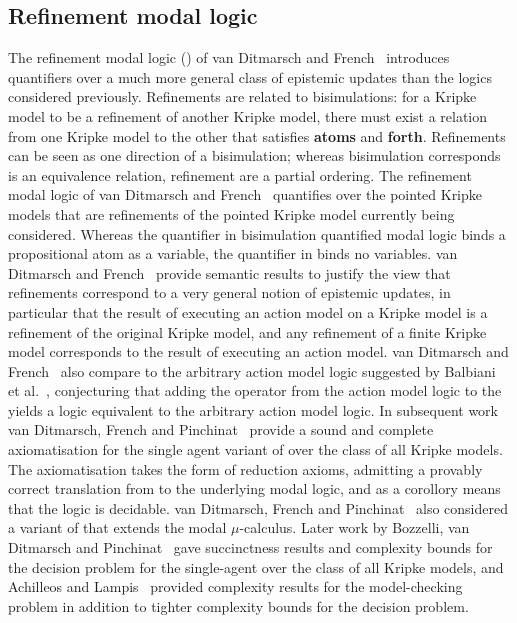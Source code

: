 \subsection{Refinement modal logic}

The refinement modal logic (\logicRml{}) of van Ditmarsch and French~\cite{vanditmarsch:2009} introduces quantifiers over a much more general class of epistemic updates than the logics considered previously.
Refinements are related to bisimulations: for a Kripke model to be a refinement of another Kripke model, there must exist a relation from one Kripke model to the other that satisfies {\bf atoms} and {\bf forth}.
Refinements can be seen as one direction of a bisimulation; whereas bisimulation corresponds is an equivalence relation, refinement are a partial ordering.
The refinement modal logic of van Ditmarsch and French~\cite{vanditmarsch:2009} quantifies over the pointed Kripke models that are refinements of the pointed Kripke model currently being considered.
Whereas the quantifier in bisimulation quantified modal logic binds a propositional atom as a variable, the quantifier in \logicRml{} binds no variables.
van Ditmarsch and French~\cite{vanditmarsch:2009} provide semantic results to justify the view that refinements correspond to a very general notion of epistemic updates, in particular that the result of executing an action model on a Kripke model is a refinement of the original Kripke model, and any refinement of a finite Kripke model corresponds to the result of executing an action model.
van Ditmarsch and French~\cite{vanditmarsch:2009} also compare \logicRml{} to the arbitrary action model logic suggested by Balbiani et al.~\cite{balbiani:2007}, conjecturing that adding the operator from the action model logic to the \logicRml{} yields a logic equivalent to the arbitrary action model logic.
In subsequent work van Ditmarsch, French and Pinchinat~\cite{vanditmarsch:2010} provide a sound and complete axiomatisation for the single agent variant of \logicRml{} over the class of all Kripke models.
The axiomatisation takes the form of reduction axioms, admitting a provably correct translation from \logicRml{} to the underlying modal logic, and as a corollory means that the logic is decidable.
van Ditmarsch, French and Pinchinat~\cite{vanditmarsch:2010} also considered a variant of \logicRml{} that extends the modal $\mu$-calculus.
Later work by Bozzelli, van Ditmarsch and Pinchinat~\cite{bozzelli:2014a} gave succinctness results and complexity bounds for the decision problem for the single-agent \logicRml{} over the class of all Kripke models, and Achilleos and Lampis~\cite{achilleos:2013} provided complexity results for the model-checking problem in addition to tighter complexity bounds for the decision problem.
